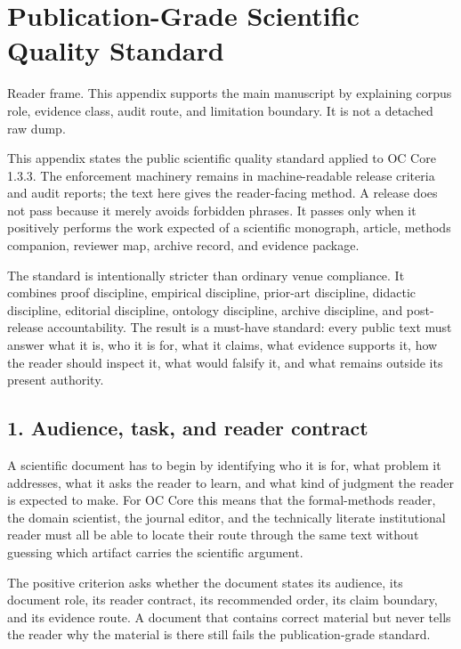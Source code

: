 \section{Publication-Grade Scientific Quality Standard}
Reader frame. This appendix supports the main manuscript by explaining corpus role, evidence class, audit route, and limitation boundary. It is not a detached raw dump.


\label{sec:oc133-public-scientific-quality-standard}

This appendix states the public scientific quality standard applied to OC Core 1.3.3. The enforcement machinery remains in machine-readable release criteria and audit reports; the text here gives the reader-facing method. A release does not pass because it merely avoids forbidden phrases. It passes only when it positively performs the work expected of a scientific monograph, article, methods companion, reviewer map, archive record, and evidence package.


The standard is intentionally stricter than ordinary venue compliance. It combines proof discipline, empirical discipline, prior-art discipline, didactic discipline, editorial discipline, ontology discipline, archive discipline, and post-release accountability. The result is a must-have standard: every public text must answer what it is, who it is for, what it claims, what evidence supports it, how the reader should inspect it, what would falsify it, and what remains outside its present authority.


\subsection{1. Audience, task, and reader contract}

A scientific document has to begin by identifying who it is for, what problem it addresses, what it asks the reader to learn, and what kind of judgment the reader is expected to make. For OC Core this means that the formal-methods reader, the domain scientist, the journal editor, and the technically literate institutional reader must all be able to locate their route through the same text without guessing which artifact carries the scientific argument.


The positive criterion asks whether the document states its audience, its document role, its reader contract, its recommended order, its claim boundary, and its evidence route. A document that contains correct material but never tells the reader why the material is there still fails the publication-grade standard.


